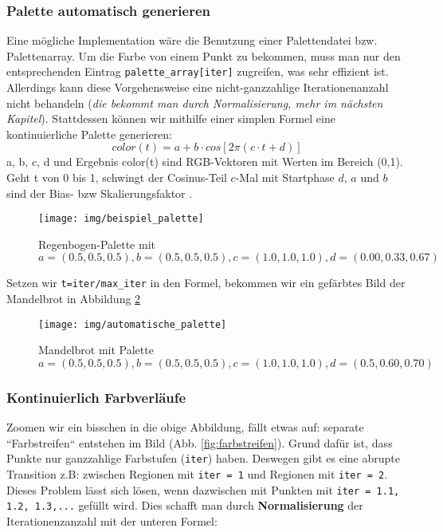 \documentclass{article}
\begin{document}
\subsubsection{Palette automatisch generieren}
Eine mögliche Implementation wäre die Benutzung einer Palettendatei bzw. Palettenarray. Um die Farbe von einem Punkt zu bekommen, muss man nur den entsprechenden Eintrag \lstinline|palette_array[iter]| zugreifen, was sehr effizient ist. Allerdings kann diese Vorgehensweise eine nicht-ganzzahlige Iterationenanzahl nicht behandeln (\textit{die bekommt man durch Normalisierung, mehr im nächsten Kapitel}). Stattdessen können wir mithilfe einer simplen Formel eine kontinuierliche Palette generieren:
$$color(t) = a + b \cdot cos[ 2\pi(c \cdot t+d)] $$
a, b, c, d und Ergebnis color(t) sind RGB-Vektoren mit Werten im Bereich (0,1). Geht t von 0 bis 1, schwingt der Cosinus-Teil $c$-Mal mit Startphase $d$, $a$ und $b$ sind der Bias- bzw Skalierungsfaktor \cite{quilez}. 

\begin{figure}[!htb]
\centering
\texttt{[image: img/beispiel\_palette]}
\caption{Regenbogen-Palette mit $a=(0.5,0.5,0.5), b=(0.5, 0.5, 0.5), c=(1.0, 1.0, 1.0), d=(0.00, 0.33, 0.67)$}
\label{fig:beispielpalette}
\end{figure}

Setzen wir \lstinline|t=iter/max_iter| in den Formel, bekommen wir ein gefärbtes Bild der Mandelbrot in Abbildung \ref{fig:mandelbrot_palette}

\begin{figure}[!h]
\centering
\texttt{[image: img/automatische\_palette]}
\caption{Mandelbrot mit Palette $a=(0.5,0.5,0.5), b=(0.5,0.5,0.5),c=(1.0,1.0,1.0),d=(0.5,0.60,0.70)$}
\label{fig:mandelbrot_palette}
\end{figure}

\subsubsection{Kontinuierlich Farbverläufe}
Zoomen wir ein bisschen in die obige Abbildung, fällt etwas auf: separate ``Farbstreifen`` entstehen im Bild (Abb. \ref{fig:farbstreifen}). Grund dafür ist, dass Punkte nur ganzzahlige Farbstufen (\lstinline|iter|) haben. Deswegen gibt es eine abrupte Transition z.B: zwischen Regionen mit \lstinline|iter = 1| und Regionen mit \lstinline|iter = 2|. Dieses Problem lässt sich lösen, wenn dazwischen mit Punkten mit \lstinline|iter = 1.1, 1.2, 1.3,...| gefüllt wird. Dies schafft man durch \textbf{Normalisierung} der Iterationenzanzahl mit der unteren Formel:
\end{document}
